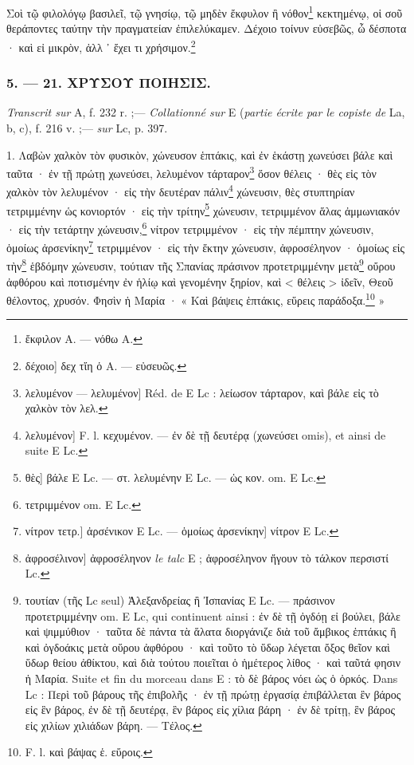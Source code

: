 \documentclass[a4paper, 11pt, oneside, polutonikogreek, french]{article}
\begin{document}
Σοὶ τῷ φιλολόγῳ βασιλεῖ, τῷ γνησίῳ, τῷ μηδὲν ἔκφυλον ἢ νόθον\footnote{ἔκφιλον A. --- νόθω A.} κεκτημένῳ, οἱ σοῦ θεράποντες ταύτην τὴν πραγματείαν ἐπιλελύκαμεν. Δέχοιο τοίνυν εὐσεβῶς, ὦ δέσποτα · καὶ εἰ μικρὸν, ἀλλ ᾽ ἔχει τι χρήσιμον.\footnote{δέχοιο] δεχ τἴη ὁ A. --- εὐσευῶς.}

\bigskip
\centerline{\EightStarTaper}
\centerline{\EightStarTaper\EightStarTaper}
\bigskip

\subsubsection{5. --- 21. ΧΡΥΣΟΥ ΠΟΙΗΣΙΣ.}

\emph{Transcrit sur} A, f. 232 r. ;--- \emph{Collationné sur} E (\emph{partie écrite par le copiste de} La, b, c), f. 216 v. ;--- \emph{sur} Lc, p. 397.

\bigskip

1. Λαβὼν χαλκὸν τὸν φυσικὸν, χώνευσον ἑπτάκις, καὶ ἐν ἑκάστῃ χωνεύσει βάλε καὶ ταῦτα · ἐν τῇ πρώτῃ χωνεύσει, λελυμένον τάρταρον\footnote{λελυμένον --- λελυμένον] Réd. de E Lc : λείωσον τάρταρον, καὶ βάλε εἰς τὸ χαλκὸν τὸν λελ.} ὅσον θέλεις · θὲς εἰς τὸν χαλκὸν τὸν λελυμένον · εἰς τὴν δευτέραν πάλιν\footnote{λελυμένον] F. l. κεχυμένον. --- ἐν δὲ τῇ δευτέρᾳ (χωνεύσει omis), et ainsi de suite E Lc.} χώνευσιν, θὲς στυπτηρίαν τετριμμένην ὡς κονιορτόν · εἰς τὴν τρίτην\footnote{θὲς] βάλε E Lc. --- στ. λελυμένην E Lc. --- ὡς κον. om. E Lc.} χώνευσιν, τετριμμένον ἅλας ἀμμωνιακόν · εἰς τὴν τετάρτην χώνευσιν,\footnote{τετριμμένον om. E Lc.} νίτρον τετριμμένον · εἰς τὴν πέμπτην χώνευσιν, ὁμοίως ἀρσενίκην\footnote{νίτρον τετρ.] ἀρσένικον E Lc. --- ὁμοίως ἀρσενίκην] νίτρον E Lc.} τετριμμένον · εἰς τὴν ἕκτην χώνευσιν, ἀφροσέληνον · ὁμοίως εἰς τὴν\footnote{ἀφροσέλινον] ἀφροσέληνον \emph{le talc} E ; ἀφροσέληνον ἤγουν τὸ τάλκον περσιστί Lc.} ἑβδόμην χώνευσιν, τούτιαν τῆς Σπανίας πράσινον προτετριμμένην μετὰ\footnote{τουτίαν (τῆς Lc seul) Ἀλεξανδρείας ἢ Ἰσπανίας E Lc. --- πράσινον προτετριμμένην om. E Lc, qui continuent ainsi : ἐν δὲ τῇ ὀγδόῃ εἰ βούλει, βάλε καὶ ψιμμύθιον · ταῦτα δὲ πάντα τὰ ἅλατα διοργάνιζε διὰ τοῦ ἄμβικος ἑπτάκις ἢ καὶ ὀγδοάκις μετὰ οὕρου ἀφθόρου · καὶ τοῦτο τὸ ὕδωρ λέγεται ὄξος θεῖον καὶ ὕδωρ θείου ἀθίκτου, καὶ διὰ τούτου ποιεῖται ὁ ἡμέτερος λίθος · καὶ ταῦτά φησιν ἡ Μαρία. Suite et fin du morceau dans E : τὸ δὲ βάρος νόει ὡς ὁ ὀρκός. Dans Lc : Περὶ τοῦ βάρους τῆς ἐπιβολῆς · ἐν τῇ πρώτῃ ἐργασίᾳ ἐπιβάλλεται ἓν βάρος εἰς ἓν βάρος, ἐν δὲ τῇ δευτέρᾳ, ἓν βάρος εἰς χίλια βάρη · ἐν δὲ τρίτῃ, ἓν βάρος εἰς χιλίων χιλιάδων βάρη. --- Τέλος.} οὔρου ἀφθόρου καὶ ποτισμένην ἐν ἡλίῳ καὶ γενομένην ξηρίον, καὶ < θέλεις > ἰδεῖν, Θεοῦ θέλοντος, χρυσόν. Φησὶν ἡ Μαρία · « Καὶ βάψεις ἑπτάκις, εὕρεις παράδοξα.\footnote{F. l. καὶ βάψας ἑ. εὕροις.} »
\end{document}
